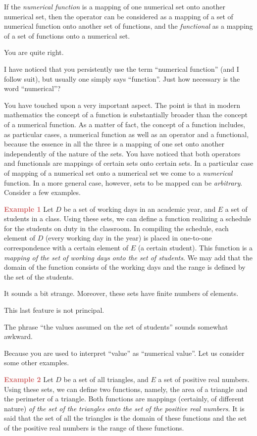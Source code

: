 {\rdr If the \emph{numerical function} is a mapping of one numerical set onto another numerical set, then the operator can be considered as a mapping of a set of numerical function onto another set of functions, and the \emph{functional} as a mapping of a set of functions onto a numerical set.

\athr You are quite right.

\rdr I have noticed that you persistently use the term ``numerical function'' (and I follow suit), but usually one simply says ``function''. Just how necessary is the word ``numerical''?

\athr You have touched upon a very important aspect. The point is that in modern mathematics the concept of a function is substantially broader than the concept of a numerical function. As a matter of fact, the concept of a function includes, as particular cases, a numerical function as well as an operator and a functional, because the essence in all the three is a mapping of one set onto another independently of the nature of the sets. You have noticed that both operators and functionals are mappings of certain sets onto certain sets. In a particular case of mapping of a numerical set onto a numerical set we come to a \emph{numerical} function. In a more general case, however, sets to be mapped can be \emph{arbitrary}. Consider a few examples.

\textcolor{IndianRed}{\textbf{Example 1}} Let $D$ be a set of working days in an academic year, and $E$ a set of students in a class. Using these sets, we can define a function realizing a schedule for the students on duty in the classroom. In compiling the schedule, each element of $D$ (every working day in the year) is placed in one-to-one correspondence with a certain element of $E$ (a certain student). This function is a \emph{mapping of the set of working days onto the set of students}. We may add that the domain of the function consists of the working days and the range is defined by the set of the students.

\rdr It sounds a bit strange. Moreover, these sets have finite numbers of elements.

\athr This last feature is not principal.

\rdr The phrase ``the values assumed on the set of students'' sounds somewhat awkward.

\athr Because you are used to interpret ``value'' as ``numerical value''.
Let us consider some other examples.

\textcolor{IndianRed}{\textbf{Example 2}} Let $D$ be a set of all triangles, and $E$ a set of positive real numbers. Using these sets, we can define two functions, namely, the area of a triangle and the perimeter of a triangle. Both functions are mappings (certainly, of different nature) \emph{of the set of the triangles onto the set of the positive real numbers}. It is said that the set of all the triangles is the domain of these functions and the set of the positive real numbers is the range of these functions.

}

